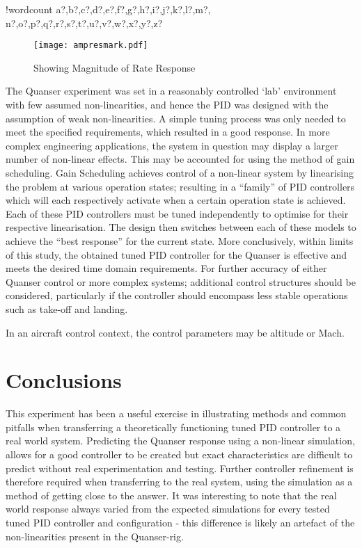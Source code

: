\documentclass[11pt]{article}
\newcounter{words}
\newenvironment{counted}{%
  \setcounter{words}{0}
  \SearchList!{wordcount}{\stepcounter{words}}
    {a?,b?,c?,d?,e?,f?,g?,h?,i?,j?,k?,l?,m?,
    n?,o?,p?,q?,r?,s?,t?,u?,v?,w?,x?,y?,z?}
  \UndoBoundary{'}
  \SearchOrder{p;}}{%
  \StopSearching}
\begin{document}
\begin{counted}
\begin{wrapfigure}{r}{0.45\textwidth}
\vspace{-10pt}
\centering
 \texttt{[image: ampresmark.pdf]}
\vspace{-5pt}
\caption{Showing Magnitude of Rate Response}
 \vspace{-20pt}
 \label{ampres}
\end{wrapfigure}

The Quanser experiment was set in a reasonably controlled `lab'
environment with few assumed non-linearities, and hence the PID was
designed with the assumption of weak non-linearities. A simple tuning
process was only needed to meet the specified requirements, which
resulted in a good response. In more complex engineering applications,
the system in question may display a larger number of non-linear
effects. This may be accounted for using the method of gain scheduling.
Gain Scheduling \cite{stackcont} achieves control of a non-linear system
by linearising the problem at various operation states; resulting in a
``family'' of PID controllers which will each respectively activate when
a certain operation state is achieved. Each of these PID controllers
must be tuned independently to optimise for their respective
linearisation. The design then switches between each of these models to
achieve the ``best response'' for the current state. More conclusively,
within limits of this study, the obtained tuned PID controller for the
Quanser is effective and meets the desired time domain requirements. For
further accuracy of either Quanser control or more complex systems;
additional control structures should be considered, particularly if the
controller should encompass less stable operations such as take-off and
landing.

In an aircraft control context, the control parameters may be altitude
or Mach.

\section{Conclusions}\label{conclusions}

This experiment has been a useful exercise in illustrating methods and
common pitfalls when transferring a theoretically functioning tuned PID
controller to a real world system. Predicting the Quanser response using
a non-linear simulation, allows for a good controller to be created but
exact characteristics are difficult to predict without real
experimentation and testing. Further controller refinement is therefore
required when transferring to the real system, using the simulation as a
method of getting close to the answer. It was interesting to note that
the real world response always varied from the expected simulations for
every tested tuned PID controller and configuration - this difference is
likely an artefact of the non-linearities present in the Quanser-rig.


\end{counted}
\end{document}
